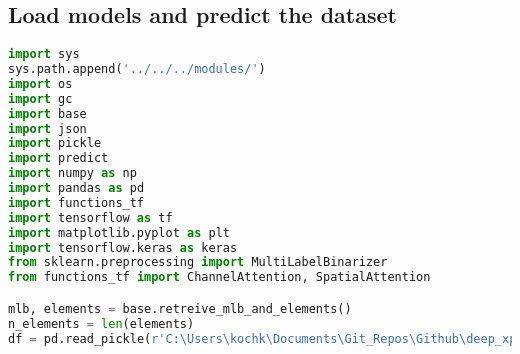 \hypertarget{load-models-and-predict-the-dataset}{%
\subsection*{Load models and predict the
dataset}\label{load-models-and-predict-the-dataset}}

\begin{lstlisting}[language=Python]
import sys
sys.path.append('../../../modules/')
import os
import gc
import base
import json
import pickle
import predict
import numpy as np
import pandas as pd
import functions_tf
import tensorflow as tf
import matplotlib.pyplot as plt
import tensorflow.keras as keras
from sklearn.preprocessing import MultiLabelBinarizer
from functions_tf import ChannelAttention, SpatialAttention

mlb, elements = base.retreive_mlb_and_elements()
n_elements = len(elements)
df = pd.read_pickle(r'C:\Users\kochk\Documents\Git_Repos\Github\deep_xps\data\experimental_data_elemental.pkl')
\end{lstlisting}

